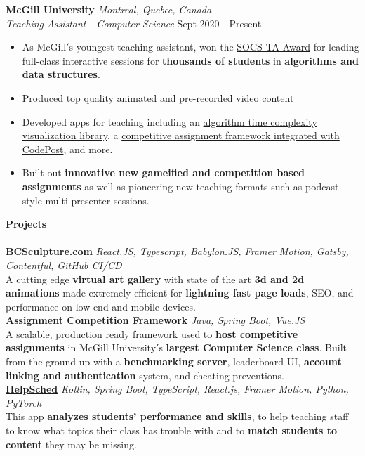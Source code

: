 \documentclass[a4paper]{article}
\newcommand{\lineunder} {
    \vspace*{-8pt} \\
    \hspace*{-18pt} \hrulefill \\
}
\newcommand{\header} [1] {
    {\hspace*{-18pt}\vspace*{6pt} \textbf{#1}}
    \vspace*{-6pt} \lineunder
}
\begin{document}
\textbf{McGill University} \hfill \textit{Montreal, Quebec, Canada}\\
\textit{Teaching Assistant - Computer Science} \hfill Sept 2020 - Present\\
\vspace{-1mm}
\begin{itemize} \itemsep 1pt
	\item As McGill$'$s youngest teaching assistant, won the \href{https://www.cs.mcgill.ca/academic/ta/awards/}{SOCS TA Award} for leading full-class interactive sessions for \textbf{thousands of students} in \textbf{algorithms and data structures}.
	\item Produced top quality  \href{https://www.youtube.com/watch?v=c0DQO5L7LS0}{animated and pre-recorded video content}
	\item Developed apps for teaching including an \href{https://github.com/TheBigSasha/RuntimeTester}{algorithm time complexity visualization library}, a \href{https://github.com/TheBigSasha/best-of-comp-server}{competitive assignment framework integrated with CodePost}, and more.
	\item Built out \textbf{innovative new gameified and competition based assignments} as well as pioneering new teaching formats such as podcast style multi presenter sessions.
\end{itemize}

\header{Projects}
\vspace{2mm}
{\href{http://bcsculpture.com/}{\textbf{BCSculpture.com}}} {\sl React.JS, Typescript, Babylon.JS, Framer Motion, Gatsby, Contentful, GitHub CI/CD}\\
A cutting edge \textbf{virtual art gallery} with state of the art \textbf{3d and 2d animations} made extremely efficient for \textbf{lightning fast page loads}, SEO, and performance on low end and mobile devices.\\
\vspace*{4mm}
{\href{https://github.com/TheBigSasha/best-of-comp-server}{\textbf{Assignment Competition Framework}}} {\sl Java, Spring Boot, Vue.JS} \hfill \\
A scalable, production ready framework used to \textbf{host competitive assignments} in McGill University$'$s \textbf{largest Computer Science class}. Built from the ground up with a \textbf{benchmarking server}, leaderboard UI, \textbf{account linking and authentication} system, and cheating preventions.\\
\vspace*{4mm}
{\href{https://github.com/TheBigSasha/}{\textbf{HelpSched}}} {\sl Kotlin, Spring Boot, TypeScript, React.js, Framer Motion, Python, PyTorch}\\
This app \textbf{analyzes students' performance and skills}, to help teaching staff to know what topics their class has trouble with and to \textbf{match students to content} they may be missing.\\
\vspace*{2mm}




\ 
\end{document}
